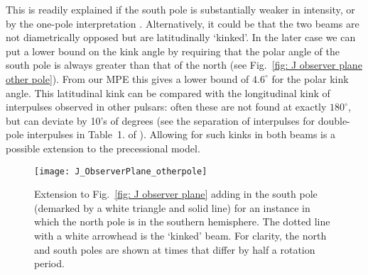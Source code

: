 \documentclass[../full_thesis/full_thesis.tex]{subfiles}
\newcommand{\degr}{^{\circ}}
\begin{document}
\begin{subappendices}
This is readily explained if the south pole is substantially weaker in
intensity, or by the one-pole interpretation \citet{Manchester1977}.
Alternatively, it could be that  the two beams are not diametrically opposed
but are latitudinally `kinked'. In the later case we can put a lower bound on
the kink angle by requiring that the polar angle of the south pole is always
greater than that of the north (see Fig.~\ref{fig: J observer  plane other
pole}). From our MPE this gives a lower bound of $4.6\degr$ for the polar kink
angle. This latitudinal kink can be compared with the longitudinal kink of
interpulses observed in other pulsars: often these are not found at exactly
$180\degr$, but can deviate by 10's of degrees (see the separation of
interpulses for double-pole interpulses in Table~1. of \cite{Maciesiak2011}).
Allowing for such kinks in both beams is a possible extension to the
precessional model.

\begin{figure}
\centering
\texttt{[image: J\_ObserverPlane\_otherpole]}
\caption{Extension to Fig.~\ref{fig: J observer plane} adding in the south pole
(demarked by a white triangle and solid line) for an instance in which the
north pole is in the southern hemisphere. The dotted line with a white
arrowhead is the `kinked' beam.  For clarity, the north and south poles are
shown at times that differ by half a rotation period.}
\label{fig: J observer plane other pole}
\end{figure}


\end{subappendices}
\end{document}
